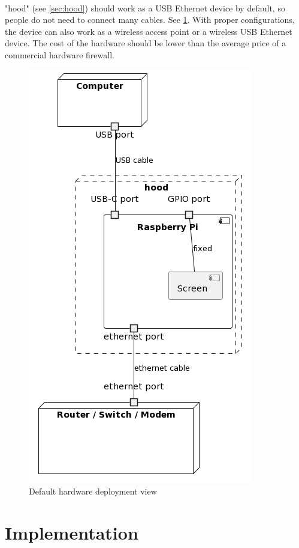 \documentclass[mscthesis]{usiinfthesis}
\begin{document}
\paragraph{}
"hood" (see \cref{sec:hood}) should work as a USB Ethernet device by default, so people do not need to connect many cables. See \cref{fig:hardware-deployment-view}. With proper configurations, the device can also work as a wireless access point or a wireless USB Ethernet device. The cost of the hardware should be lower than the average price of a commercial hardware firewall.
\begin{figure}[H]
  \centering
  \includegraphics[scale=0.5]{graphics/puml/hardware-deployment-view.png}
  \caption{Default hardware deployment view}
  \label{fig:hardware-deployment-view}
\end{figure}

\section{Implementation}
\end{document}
